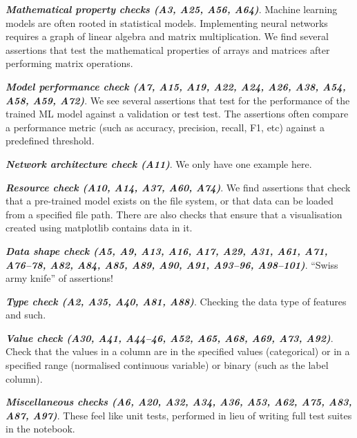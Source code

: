 \documentclass[sigconf]{acmart}
\begin{document}

\textbf{\emph{Mathematical property checks (A3, A25, A56, A64)}}. Machine learning models are often rooted in statistical models. Implementing neural networks requires a graph of linear algebra and matrix multiplication. We find several assertions that test the mathematical properties of arrays and matrices after performing matrix operations.


\textbf{\emph{Model performance check (A7, A15, A19, A22, A24, A26, A38, A54, A58, A59, A72)}}. We see several assertions that test for the performance of the trained ML model against a validation or test test. The assertions often compare a performance metric (such as accuracy, precision, recall, F1, etc) against a predefined threshold.

\textbf{\emph{Network architecture check (A11)}}. We only have one example here.

\textbf{\emph{Resource check (A10, A14, A37, A60, A74)}}. We find assertions that check that a pre-trained model exists on the file system, or that data can be loaded from a specified file path. There are also checks that ensure that a visualisation created using matplotlib contains data in it.

\textbf{\emph{Data shape check (A5, A9, A13, A16, A17, A29, A31, A61, A71, A76--78, A82, A84, A85, A89, A90, A91, A93--96, A98--101)}}. ``Swiss army knife'' of assertions!

\textbf{\emph{Type check (A2, A35, A40, A81, A88)}}. Checking the data type of features and such.

\textbf{\emph{Value check (A30, A41, A44--46, A52, A65, A68, A69, A73, A92)}}. Check that the values in a column are in the specified values (categorical) or in a specified range (normalised continuous variable) or binary (such as the label column).

\textbf{\emph{Miscellaneous checks (A6, A20, A32, A34, A36, A53, A62, A75, A83, A87, A97)}}. These feel like unit tests, performed in lieu of writing full test suites in the notebook.

 
\end{document}
